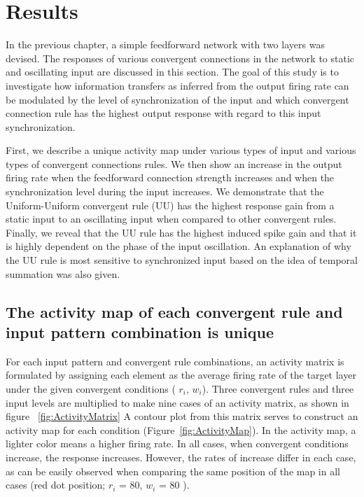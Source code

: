 \chapter{Results}
 In the previous chapter, a simple feedforward network with two layers was devised. The responses of various convergent connections in the network to static and oscillating input are discussed in this section. The goal of this study is to investigate how information transfers as inferred from the output firing rate can be modulated by the level of synchronization of the input and which convergent connection rule has the highest output response with regard to this input synchronization.

First, we describe a unique activity map under various types of input and various types of convergent connections rules. We then show an increase in the output firing rate when the feedforward connection strength increases and when the synchronization level during the input increases. We demonstrate that the Uniform-Uniform convergent rule (UU) has the highest response gain from a static input to an oscillating input when compared to other convergent rules. Finally, we reveal that the UU rule has the highest induced spike gain and that it is highly dependent on the phase of the input oscillation. An explanation of why the UU rule is most sensitive to synchronized input based on the idea of temporal summation was also given.

%
%
%
%
%
%
%
%


\section{The activity map of each convergent rule and input pattern combination is unique}
 For each input pattern and convergent rule combinations, an activity matrix is formulated by assigning each element as the average firing rate of the target layer under the given convergent conditions ( $r_i$, $w_i$). Three convergent rules and three input levels are multiplied to make nine cases of an activity matrix, as shown in figure ~\ref{fig:ActivityMatrix} 
A contour plot from this matrix serves to construct an activity map for each condition (Figure~\ref{fig:ActivityMap}). In the activity map, a lighter color means a higher firing rate. In all cases, when convergent conditions increase, the response increases. However, the rates of increase differ in each case, as can be easily observed when comparing the same position of the map in all cases (red dot position; $r_i$ = 80, $w_i$ = 80 ). 


